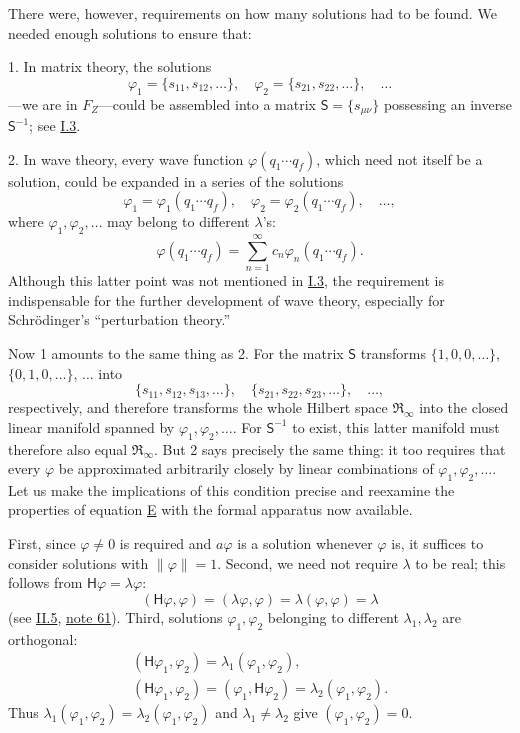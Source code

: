 \documentclass[fontsize=13pt,twoside,openany,headings=normal,parskip=false,bookmarkpackage=false,DIV=calc]{scrbook}
\begin{document}
\hypertarget{origpage-54}{}%
There were, however, requirements on how many solutions had to be found. We needed enough solutions to ensure that:

1. In matrix theory, the solutions
\[
\varphi_1=\{s_{11},s_{12},\ldots\},\quad\varphi_2=\{s_{21},s_{22},\ldots\},\quad\ldots
\]
---we are in $F_Z$---could be assembled into a matrix $\mathsf S=\{s_{\mu\nu}\}$ possessing an inverse $\mathsf S^{-1}$; see \hyperref[sec:I.3]{I.3}.

2. In wave theory, every wave function $\varphi(q_1\cdots q_f)$, which need not itself be a solution, could be expanded in a series of the solutions
\[
\varphi_1=\varphi_1(q_1\cdots q_f),\quad\varphi_2=\varphi_2(q_1\cdots q_f),\quad\ldots,
\]
where $\varphi_1,\varphi_2,\ldots$ may belong to different $\lambda$'s:
\[
\varphi(q_1\cdots q_f)=\sum_{n=1}^\infty c_n\varphi_n(q_1\cdots q_f).
\]
Although this latter point was not mentioned in \hyperref[sec:I.3]{I.3}, the requirement is indispensable for the further development of wave theory, especially for Schr\"odinger's ``perturbation theory.''

Now 1 amounts to the same thing as 2. For the matrix $\mathsf S$ transforms $\{1,0,0,\ldots\}$, $\{0,1,0,\ldots\}$, $\ldots$ into
\[
\{s_{11},s_{12},s_{13},\ldots\},\quad\{s_{21},s_{22},s_{23},\ldots\},\quad\ldots,
\]
respectively, and therefore transforms the whole Hilbert space $\mathfrak{R}_\infty$ into the closed linear manifold spanned by $\varphi_1,\varphi_2,\ldots$. For $\mathsf S^{-1}$ to exist, this latter manifold must therefore also equal $\mathfrak{R}_\infty$. But 2 says precisely the same thing: it too requires that every $\varphi$ be approximated arbitrarily closely by linear combinations of $\varphi_1,\varphi_2,\ldots$. Let us make the implications of this condition precise and reexamine the properties of equation \hyperref[eq:II.6.E]{E} with the formal apparatus now available.

First, since $\varphi\ne0$ is required and $a\varphi$ is a solution whenever $\varphi$ is, it suffices to consider solutions with $\|\varphi\|=1$. Second, we need not require $\lambda$ to be real; this follows from $\mathsf H\varphi=\lambda\varphi$:
\[
(\mathsf H\varphi,\varphi)=(\lambda\varphi,\varphi)=\lambda(\varphi,\varphi)=\lambda
\]
(see \hyperref[sec:II.5]{II.5}, \hyperlink{note-61}{note 61}). Third, solutions $\varphi_1,\varphi_2$ belonging to different $\lambda_1,\lambda_2$ are orthogonal:
\begin{gather*}
(\mathsf H\varphi_1,\varphi_2)=\lambda_1(\varphi_1,\varphi_2),\\
(\mathsf H\varphi_1,\varphi_2)=(\varphi_1,\mathsf H\varphi_2)=\lambda_2(\varphi_1,\varphi_2).
\end{gather*}
Thus $\lambda_1(\varphi_1,\varphi_2)=\lambda_2(\varphi_1,\varphi_2)$ and $\lambda_1\ne\lambda_2$ give $(\varphi_1,\varphi_2)=0$.
\end{document}
